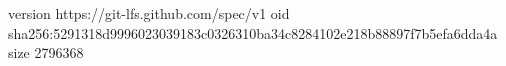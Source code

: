version https://git-lfs.github.com/spec/v1
oid sha256:5291318d9996023039183c0326310ba34c8284102e218b88897f7b5efa6dda4a
size 2796368
